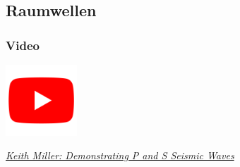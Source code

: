 \subsection{Raumwellen}

\begin{frame}
\frametitle{Video}
\begin{center}
\includegraphics[width=0.2\textwidth]{fig_img/youtube.png}   
\end{center}


\href{https://www.youtube.com/watch?v=gjRGIpP-Qfw}{\textsl{Keith Miller: Demonstrating P and S Seismic Waves}}

\end{frame}


